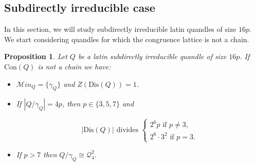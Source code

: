\documentclass[a4paper, english, 9pt]{amsart}
\theoremstyle{plain}
\newtheorem{proposition}[theorem]{Proposition}
\theoremstyle{definition}
\def\dis{\mathrm{Dis}}
\def\con{\mathrm{Con}}
\def\comment#1{{\color{red} #1}}
\def\ma{\mathcal Min}
\begin{document}
 
\subsection{Subdirectly irreducible case}

In this section, we will study subdirectly irreducible latin quandles of size $16p$. We start considering quandles for which the congruence lattice is not a chain.

\begin{proposition}\label{SI 16p case 4p}
Let $Q$ be a latin subdirectly irreducible quandle of size $16p$. If $\con(Q)$ is not a chain we have:
\begin{itemize}
    \item[(i)] $\ma_Q=\{\gamma_Q\}$ and $Z(\dis(Q))=1$.
    \item[(ii)] If $|Q/\gamma_Q|=4p$, then $p\in \{3,5,7\}$ and 
    
     $$
    |\dis(Q)| \text{ divides } \begin{cases} 2^{6}p \text{ if } p\neq 3,\\
    2^{6}\cdot 3^2  \text{ if } p= 3.
    \end{cases}$$
    
    \item[(iii)] If $p>7$ then $Q/\gamma_Q\cong \mathcal{Q}_4^2$. 
\end{itemize}
\end{proposition}
 

\end{document}

